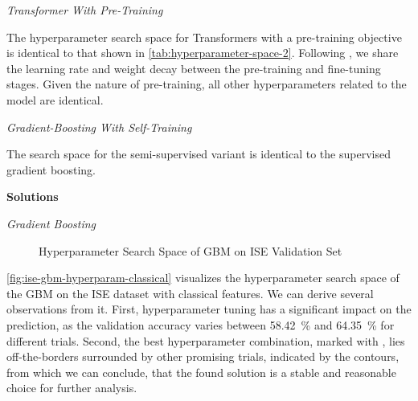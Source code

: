 \emph{Transformer With Pre-Training}

The hyperparameter search space for Transformers with a pre-training objective is identical to that shown in \cref{tab:hyperparameter-space-2}. Following \textcite[][4]{rubachevRevisitingPretrainingObjectives2022}, we share the learning rate and weight decay between the pre-training and fine-tuning stages. Given the nature of pre-training, all other hyperparameters related to the model are identical.

\emph{Gradient-Boosting With Self-Training}

The search space for the semi-supervised variant is identical to the supervised gradient boosting.

\textbf{Solutions}

\emph{Gradient Boosting}

\begin{figure}[!b]
    \vfill
\end{figure}

\clearpage

\begin{figure}[ht]
    \addtocounter{figure}{-1}
    \caption[]{Hyperparameter Search Space of \gls{GBM} on \gls{ISE} Validation Set}
    \label{fig:ise-gbm-hyperparam}
\end{figure}
\cref{fig:ise-gbm-hyperparam-classical} visualizes the hyperparameter search space of the \gls{GBM} on the \gls{ISE} dataset with classical features. We can derive several observations from it. First, hyperparameter tuning has a significant impact on the prediction, as the validation accuracy varies between \SI{58.42}{\percent} and \SI{64.35}{\percent} for different trials. Second, the best hyperparameter combination, marked with \bestcircle, lies off-the-borders surrounded by other promising trials, indicated by the contours, from which we can conclude, that the found solution is a stable and reasonable choice for further analysis.

